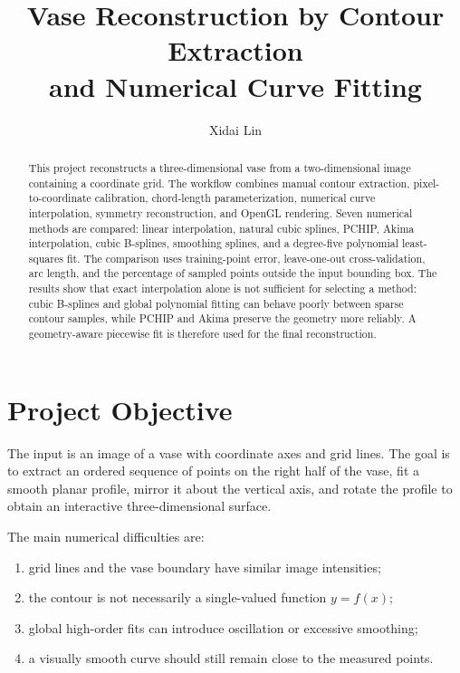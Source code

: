 \documentclass[a4paper,11pt]{article}
\title{\textbf{Vase Reconstruction by Contour Extraction\\and Numerical Curve Fitting}}
\author{Xidai Lin}
\date{}
\begin{document}
\maketitle

\begin{abstract}
This project reconstructs a three-dimensional vase from a two-dimensional image
containing a coordinate grid.  The workflow combines manual contour extraction,
pixel-to-coordinate calibration, chord-length parameterization, numerical curve
interpolation, symmetry reconstruction, and OpenGL rendering.  Seven numerical
methods are compared: linear interpolation, natural cubic splines, PCHIP, Akima
interpolation, cubic B-splines, smoothing splines, and a degree-five polynomial
least-squares fit.  The comparison uses training-point error, leave-one-out
cross-validation, arc length, and the percentage of sampled points outside the
input bounding box.  The results show that exact interpolation alone is not
sufficient for selecting a method: cubic B-splines and global polynomial fitting
can behave poorly between sparse contour samples, while PCHIP and Akima preserve
the geometry more reliably.  A geometry-aware piecewise fit is therefore used
for the final reconstruction.
\end{abstract}

\tableofcontents
\newpage

\section{Project Objective}

The input is an image of a vase with coordinate axes and grid lines.  The goal is
to extract an ordered sequence of points on the right half of the vase, fit a
smooth planar profile, mirror it about the vertical axis, and rotate the profile
to obtain an interactive three-dimensional surface.

The main numerical difficulties are:
\begin{enumerate}[label=\arabic*.]
  \item grid lines and the vase boundary have similar image intensities;
  \item the contour is not necessarily a single-valued function $y=f(x)$;
  \item global high-order fits can introduce oscillation or excessive smoothing;
  \item a visually smooth curve should still remain close to the measured points.
\end{enumerate}
\end{document}

